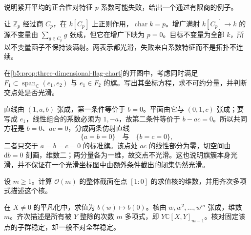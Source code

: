 \begin{exercise}\label{b5:ex:C-average-positive-characteristic}
	说明紧开平均的正合性对特征 \(p\) 系数可能失败，给出一个通过有限商的例子。
\end{exercise}
\begin{solution}
	让 \(\mathbb Z_p\) 经过商 \(C_p\)，在 \(k[C_p]\) 上正则作用，\(\operatorname{char}k=p\)。增广满射 \(k[C_p]\to k\) 的源不变量由 \(\sum_{g\in C_p}g\) 张成，但它在增广下映为 \(p=0\)。目标不变量为全部 \(k\)，所以不变量函子不保持该满射。两表示都光滑，失败来自系数特征而不是拓扑不连续。
\end{solution}

\begin{exercise}\label{b5:ex:C-three-dimensional-flag-cell}
	在\cref{b5:prop:three-dimensional-flag-chart}的开图中，考虑同时满足 \(F_1\subset\operatorname{span}_{\mathbb C}(e_1,e_2)\) 与 \(e_1\in F_2\) 的旗。写出其坐标方程，求不可约分量，并判断交点处是否光滑。
\end{exercise}
\begin{solution}
	直线由 \((1,a,b)\) 张成，第一条件等价于 \(b=0\)。平面由它与 \((0,1,c)\) 张成；要写成 \(e_1\)，线性组合的系数必须为 \(1,-a\)，故第二条件等价于 \(b-ac=0\)。所以共同方程是 \(b=0\)、\(ac=0\)，分成两条仿射直线
	\[
		\{a=b=0\}\quad\text{与}\quad\{b=c=0\},
	\]
	二者只交于 \(a=b=c=0\) 的标准旗。该点处 \(ac\) 的线性部分为零，切空间由 \(\mathrm db=0\) 刻画，维数二；两分量各为一维，故交点不光滑。这也说明旗簇本身光滑，并不保证在一个光滑坐标图中由额外条件截出的闭集仍然光滑。
\end{solution}

\begin{exercise}\label{b5:ex:C-line-bundle-evaluation}
	设 \(m\ge1\)。计算 \(\mathcal O(m)\) 的整体截面在点 \([1:0]\) 的求值核的维数，并用齐次多项式描述这个核。
\end{exercise}
\begin{solution}
	在 \(X\ne0\) 的平凡化中，求值为 \(b(w)\mapsto b(0)\)。核由 \(w,w^2,\ldots,w^m\) 张成，维数 \(m\)。齐次描述是所有被 \(Y\) 整除的次数 \(m\) 多项式，即 \(Y\mathbb C[X,Y]_{m-1}\)。核对固定该点的子群稳定，却一般不对全群稳定。
\end{solution}

